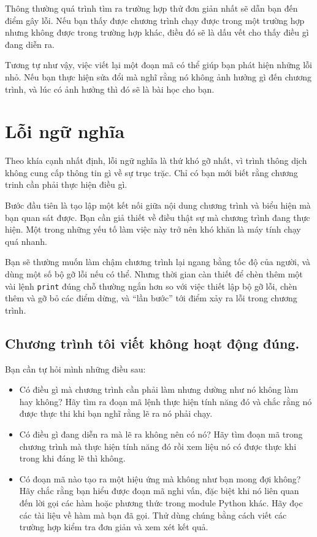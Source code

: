 \documentclass[11pt]{book}
\begin{document}

Thông thường quá trình tìm ra trường hợp thử đơn giản nhất sẽ dẫn bạn
đến điểm gây lỗi. Nếu bạn thấy được chương trình chạy được trong một
trường hợp nhưng không được trong trường hợp khác, điều đó sẽ là 
dấu vết cho thấy điều gì đang diễn ra.

Tương tự như vậy, việc viết lại một đoạn mã có thể giúp bạn phát hiện
những lỗi nhỏ. Nếu bạn thực hiện sửa đổi mà nghĩ rằng nó không ảnh
hưởng gì đến chương trình, và lúc có ảnh hưởng thì đó sẽ là bài học cho bạn.


\section{Lỗi ngữ nghĩa}

Theo khía cạnh nhất định, lỗi ngữ nghĩa là thứ khó gỡ nhất,
vì trình thông dịch không cung cấp thông tin gì về sự trục trặc.
Chỉ có bạn mới biết rằng chương trinh cần phải thực hiện điều gì.

Bước đầu tiên là tạo lập một kết nối giữa nội dung chương trình và 
biểu hiện mà bạn quan sát được. Bạn cần giả thiết về điều thật sự
mà chương trình đang thực hiện. Một trong những yếu tố làm việc này
trở nên khó khăn là máy tính chạy quá nhanh.

Bạn sẽ thường muốn làm chậm chương trình lại ngang bằng tốc độ 
của người, và dùng một số bộ gỡ lỗi nếu có thể. Nhưng thời gian 
càn thiết để chèn thêm một vài lệnh {\tt print} đúng chỗ thường 
ngắn hơn so với việc thiết lập bộ gỡ lỗi, chèn thêm và gỡ bỏ các
điểm dừng, và ``lần bước'' tới điểm xảy ra lỗi trong chương trình.

\subsection{Chương trình tôi viết không hoạt động đúng.}

Bạn cần tự hỏi mình những điều sau:

\begin{itemize}

\item Có điều gì mà chương trình cần phải làm nhưng dường như nó
không làm hay không? Hãy tìm ra đoạn mã lệnh thực hiện tính năng đó
và chắc rằng nó được thực thi khi bạn nghĩ rằng lẽ ra nó phải chạy.

\item Có điều gì đang diễn ra mà lẽ ra không nên có nó? Hãy tìm đoạn
mã trong chương trình mà thực hiện tính năng đó rồi xem liệu nó có
được thực khi trong khi đáng lẽ thì không.

\item Có đoạn mã nào tạo ra một hiệu ứng mà không như bạn mong đợi không?
Hãy chắc rằng bạn hiểu được đoạn mã nghi vấn, đặc biệt khi nó liên quan đến
lời gọi các hàm hoặc phương thức trong module Python khác. Hãy đọc các
tài liệu về hàm mà bạn đã gọi. Thử dùng chúng bằng cách viết các trường hợp
kiểm tra đơn giản và xem xét kết quả.

\end{itemize}
\end{document}
